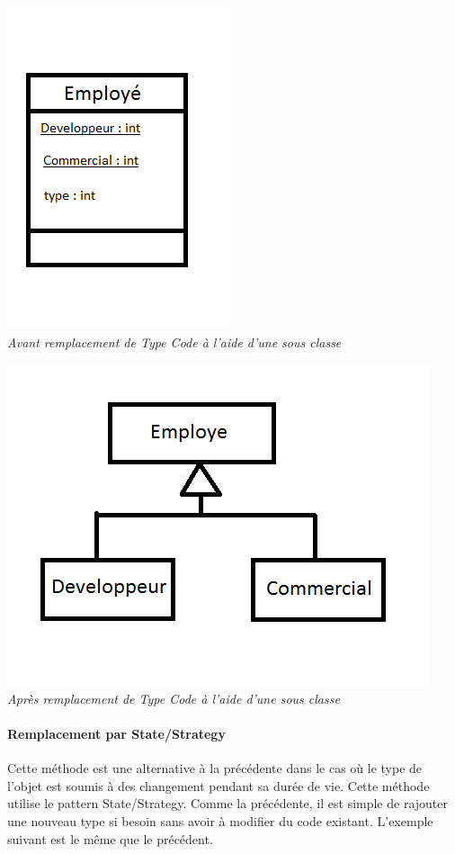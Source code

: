 \documentclass[a4paper,twoside,12pt,openright]{report}
\begin{document}
\begin{center}
\includegraphics[scale=1]{Image/TypeCode_SousClasse.png}\\
\itshape{Avant remplacement de Type Code à l'aide d'une sous classe}
\end{center}

\begin{center}
\includegraphics[scale=1]{Image/TypeCode_SousClasse2.png}\\
\itshape{Après remplacement de Type Code à l'aide d'une sous classe}
\end{center}

\paragraph{Remplacement par State/Strategy}
Cette méthode est une alternative à la précédente dans le cas où le type de l'objet est soumis à des changement pendant sa durée de vie. Cette méthode utilise le pattern State/Strategy. Comme la précédente, il est simple de rajouter une nouveau type si besoin sans avoir à modifier du code existant. L'exemple suivant est le même que le précédent.
\end{document}
